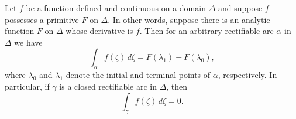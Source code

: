 Let $f$ be a function defined and continuous on a domain $\Delta$ and suppose $f$ possesses a primitive $F$ on $\Delta$. In other words, suppose there is an analytic function $F$ on $\Delta$ whose derivative is $f$. Then for an arbitrary rectifiable arc $\alpha$ in $\Delta$ we have
$$\int_{\alpha} f(\zeta) \, d\zeta = F(\lambda_1) - F(\lambda_0),$$
where $\lambda_0$ and $\lambda_1$ denote the initial and terminal points of $\alpha$, respectively. In particular, if $\gamma$ is a closed rectifiable arc in $\Delta$, then
$$\int_{\gamma} f(\zeta) \, d\zeta = 0.$$

